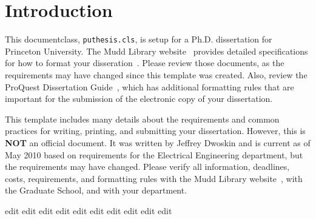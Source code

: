 
\chapter{Introduction\label{ch:intro}}

This documentclass, \texttt{puthesis.cls}, is setup for a Ph.D. dissertation for Princeton University. The Mudd Library website~\cite{mudd2009} provides detailed specifications for how to format your disseration~\cite{muddthesis2009}. Please review those documents, as the requirements may have changed since this template was created. Also, review the ProQuest Dissertation Guide~\cite{proquest2006}, which has additional formatting rules that are important for the submission of the electronic copy of your dissertation.   

This template includes many details about the requirements and common practices for writing, printing, and submitting your dissertation. However, this is \textbf{NOT} an official document. It was written by Jeffrey Dwoskin and is current as of May 2010 based on requirements for the Electrical Engineering department, but the requirements may have changed. Please verify all information, deadlines, costs, requirements, and formatting rules with the Mudd Library website~\cite{mudd2009}, with the Graduate School, and with your department.

edit edit edit edit edit edit edit edit edit edit



